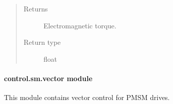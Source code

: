 \documentclass[letterpaper,10pt,english]{sphinxmanual}
\begin{document}
\begin{fulllineitems}
\begin{fulllineitems}
\begin{quote}
\begin{description}
\item[{Returns}] \leavevmode
\sphinxAtStartPar
{} \textendash{} Electromagnetic torque.

\item[{Return type}] \leavevmode
\sphinxAtStartPar
float

\end{description}\end{quote}

\end{fulllineitems}


\end{fulllineitems}



\paragraph{control.sm.vector module}
\label{\detokenize{control.sm:module-control.sm.vector}}\label{\detokenize{control.sm:control-sm-vector-module}}
\sphinxAtStartPar
This module contains vector control for PMSM drives.
\end{document}

